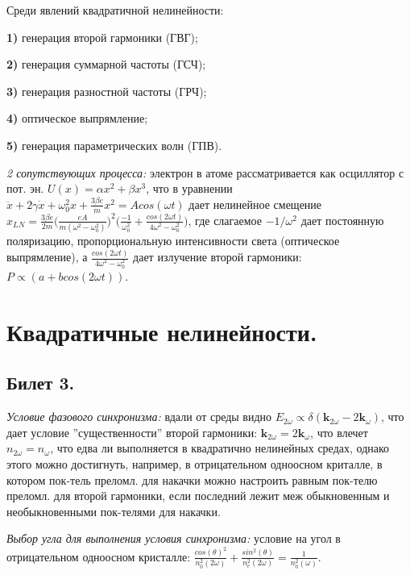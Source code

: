 \documentclass[a4paper,12pt]{article}
\theoremstyle{definition} %
\theoremstyle{definition} %
\theoremstyle{remark} %
\begin{document}
	Среди явлений квадратичной нелинейности: \\
	\par \textbf{1)} генерация второй гармоники (ГВГ); \\
	\par \textbf{2)} генерация суммарной частоты (ГСЧ); \\
	\par \textbf{3)} генерация разностной частоты (ГРЧ); \\
	\par \textbf{4)} оптическое выпрямление; \\
	\par \textbf{5)} генерация параметрических волн (ГПВ).


	\textit{2 сопутствующих процесса:} электрон в атоме рассматривается как осциллятор с пот. эн. $U(x)=\alpha x^{2} + \beta x^{3}$, что в уравнении $\ddot{x} + 2\gamma \dot{x} + \omega_{0}^{2} x + \frac{3\beta e}{m} x^{2} = Acos(\omega t)$ дает нелинейное смещение $x_{LN} = \frac{3\beta e}{2m} \Big( \frac{eA}{m(\omega^{2}-\omega_{0}^{2})} \Big)^{2} \Big( \frac{-1}{\omega_{0}^{2}} + \frac{cos(2\omega t)}{4\omega^{2}-\omega_{0}^{2}} \Big)$, где слагаемое $-1/\omega^{2}$ дает постоянную поляризацию, пропорциональную интенсивности света (оптическое выпрямление), а $\frac{cos(2\omega t)}{4\omega^{2}-\omega_{0}^{2}}$ дает излучение второй гармоники: \\ $P \propto (a+bcos(2\omega t))$.


\section{Квадратичные нелинейности.}
\subsection{Билет 3.}


	\textit{Условие фазового синхронизма:} вдали от среды видно $E_{2\omega} \propto \delta(\mathbf{k}_{2\omega}-2\mathbf{k}_{\omega})$, что дает условие ''существенности'' второй гармоники: $\mathbf{k}_{2\omega}=2\mathbf{k}_{\omega}$, что влечет $n_{2\omega}=n_{\omega}$, что едва ли выполняется в квадратично нелинейных средах, однако этого можно достигнуть, например, в отрицательном одноосном криталле, в котором пок-тель преломл. для накачки можно настроить равным пок-телю преломл. для второй гармоники, если последний лежит меж обыкновенным и необыкновенными пок-телями для накачки.


	\textit{Выбор угла для выполнения условия синхронизма:} условие на угол в отрицательном одноосном кристалле: $\frac{cos(\theta)^{2}}{n_{0}^{2}(2\omega)} + \frac{sin^{2}(\theta)}{n_{e}^{2}(2\omega)} = \frac{1}{n_{0}^{2}(\omega)}$.
\end{document}
